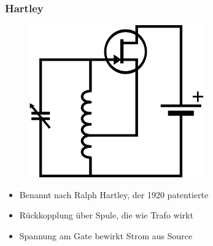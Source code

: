 \begin{frame}
  \frametitle{Hartley}
  \begin{center}
    \begin{figure}
      \includegraphics[width=0.67\textwidth,height=.5\textheight,keepaspectratio]{a07/Hartley_osc.png}
    \end{figure}
    \begin{itemize}
      \item Benannt nach Ralph Hartley, der 1920 patentierte
      \item Rückkopplung über Spule, die wie Trafo wirkt
      \item Spannung am Gate bewirkt Strom aus Source
    \end{itemize}
  \end{center}
\end{frame}

